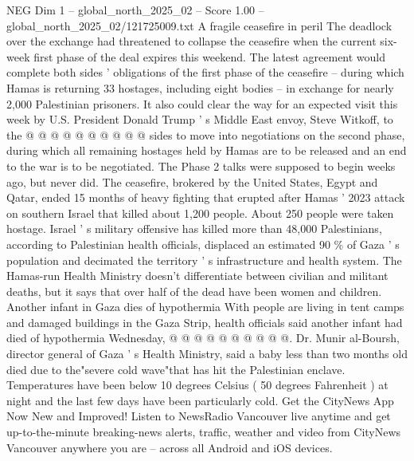 \begin{textsample}{NEG Dim 1 – global\_north\_2025\_02 – Score 1.00 – global\_north\_2025\_02/121725009.txt}
A fragile ceasefire in peril The deadlock over the exchange had threatened to collapse the ceasefire when the current six-week first phase of the deal expires this weekend.
The latest agreement would complete both sides ' obligations of the first phase of the ceasefire -- during which Hamas is returning 33 hostages, including eight bodies -- in exchange for nearly 2,000 Palestinian prisoners.
It also could clear the way for an expected visit this week by U.S.
President Donald Trump ' s Middle East envoy, Steve Witkoff, to the @ @ @ @ @ @ @ @ @ @ sides to move into negotiations on the second phase, during which all remaining hostages held by Hamas are to be released and an end to the war is to be negotiated.
The Phase 2 talks were supposed to begin weeks ago, but never did.
The ceasefire, brokered by the United States, Egypt and Qatar, ended 15 months of heavy fighting that erupted after Hamas ' 2023 attack on southern Israel that killed about 1,200 people.
About 250 people were taken hostage.
Israel ' s military offensive has killed more than 48,000 Palestinians, according to Palestinian health officials, displaced an estimated 90 \% of Gaza ' s population and decimated the territory ' s infrastructure and health system.
The Hamas-run Health Ministry doesn't differentiate between civilian and militant deaths, but it says that over half of the dead have been women and children.
Another infant in Gaza dies of hypothermia With people are living in tent camps and damaged buildings in the Gaza Strip, health officials said another infant had died of hypothermia Wednesday, @ @ @ @ @ @ @ @ @ @.
Dr.
Munir al-Boursh, director general of Gaza ' s Health Ministry, said a baby less than two months old died due to the"severe cold wave"that has hit the Palestinian enclave.
Temperatures have been below 10 degrees Celsius ( 50 degrees Fahrenheit ) at night and the last few days have been particularly cold.
Get the CityNews App Now New and Improved!
Listen to NewsRadio Vancouver live anytime and get up-to-the-minute breaking-news alerts, traffic, weather and video from CityNews Vancouver anywhere you are -- across all Android and iOS devices.

\end{textsample}
